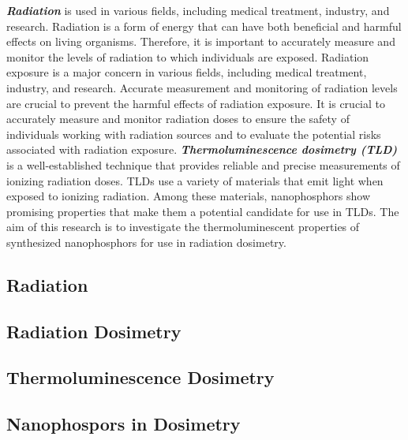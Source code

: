 \documentclass[../../Report.tex]{subfiles}
\begin{document}
    \textit{\textbf{Radiation}} is used in various fields, including medical treatment, industry, and research. 
    Radiation is a form of energy that can have both beneficial and harmful effects on living organisms.
    Therefore, it is important to accurately measure and monitor the levels of radiation to which individuals are exposed.
    Radiation exposure is a major concern in various fields, including medical treatment, industry, and research. Accurate 
    measurement and monitoring of radiation levels are crucial to prevent the harmful effects of radiation exposure.
    It is crucial to accurately measure and monitor radiation doses to ensure the safety of 
    individuals working with radiation sources and to evaluate the potential risks associated with radiation exposure. 
    \textit{\textbf{Thermoluminescence dosimetry (TLD)}} is a well-established technique that provides reliable and precise measurements 
    of ionizing radiation doses. TLDs use a variety of materials that emit light when exposed to ionizing radiation. 
    Among these materials, nanophosphors show promising properties that make them a potential candidate for use in TLDs. 
    The aim of this research is to investigate the thermoluminescent properties of synthesized nanophosphors for use in radiation dosimetry. 

    \subsection{\large Radiation}
        

    \subsection{\large Radiation Dosimetry}
        

    \subsection{\large Thermoluminescence Dosimetry}
        

    \subsection{\large Nanophospors in Dosimetry}
        
\end{document}
